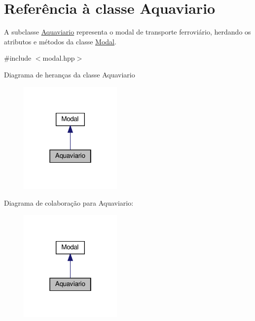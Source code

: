 \hypertarget{classAquaviario}{}\section{Referência à classe Aquaviario}
\label{classAquaviario}


A subclasse \hyperlink{classAquaviario}{Aquaviario} representa o modal de transporte ferroviário, herdando os atributos e métodos da classe \hyperlink{classModal}{Modal}.  




{\ttfamily \#include $<$modal.\+hpp$>$}



Diagrama de heranças da classe Aquaviario
\nopagebreak
\begin{figure}[H]
\begin{center}
\leavevmode
\includegraphics[width=142pt]{classAquaviario__inherit__graph}
\end{center}
\end{figure}


Diagrama de colaboração para Aquaviario\+:
\nopagebreak
\begin{figure}[H]
\begin{center}
\leavevmode
\includegraphics[width=142pt]{classAquaviario__coll__graph}
\end{center}
\end{figure}
